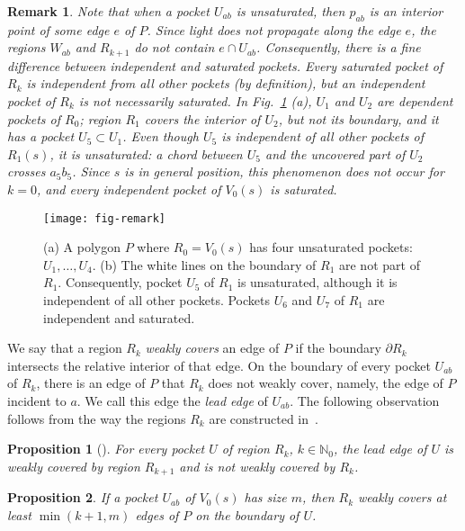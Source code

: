 \documentclass[12pt]{article}
\newtheorem{proposition}{Proposition}
\newtheorem{remark}{Remark}
\begin{document}
\begin{remark}\label{remark:1}{\rm
Note that when a pocket $U_{ab}$ is unsaturated, then $p_{ab}$ is an interior point of
some edge $e$ of $P$. Since light does not propagate along the edge $e$, the regions $W_{ab}$ and $R_{k+1}$ do not contain $e\cap U_{ab}$. Consequently, there is a fine difference between \emph{independent} and \emph{saturated} pockets. Every saturated pocket of $R_k$ is independent from all other pockets (by definition), but an independent pocket of $R_k$ is not necessarily saturated. In Fig.~\ref{fig:remark} (a), $U_1$ and $U_2$ are dependent
pockets of $R_0$; region $R_1$ covers the interior of $U_2$, but not its boundary, and it
has a pocket $U_5\subset U_1$. Even though $U_5$ is independent of all other pockets of $R_1(s)$,
it is unsaturated: a chord between $U_5$ and the uncovered part of $U_2$ crosses $a_5b_5$.
Since $s$ is in general position, this phenomenon does not occur for $k=0$, and
every independent pocket of $V_0(s)$ is saturated.}
\end{remark}

\begin{figure}[htp]
  \centering
  \texttt{[image: fig-remark]}
  \caption{\label{fig:remark}
(a) A polygon $P$ where $R_0=V_0(s)$ has four unsaturated pockets: $U_1,\ldots , U_4$.
(b) The white lines on the boundary of $R_1$ are not part of $R_1$.
Consequently, pocket $U_5$ of $R_1$ is unsaturated, although it is independent of all other pockets.
Pockets $U_6$ and $U_7$ of $R_1$ are independent and saturated.}
\end{figure}

We say that a region $R_k$ \emph{weakly covers} an edge of $P$ if the boundary $\partial R_k$
intersects the relative interior of that edge. On the boundary of every pocket $U_{ab}$ of $R_k$,
there is an edge of $P$ that $R_k$ does not weakly cover, namely, the edge of $P$ incident to $a$.
We call this edge the \emph{lead edge} of $U_{ab}$. The following observation follows from
the way the regions $R_k$ are constructed in~\cite{Us}.

\begin{proposition}[\cite{Us}]\label{pp:Us}
For every pocket $U$ of region $R_k$, $k\in \mathbb{N}_0$,
the lead edge of $U$ is weakly covered by region $R_{k+1}$
and \emph{is not} weakly covered by $R_k$.
\end{proposition}

\begin{proposition}\label{pp:Us+}
If a pocket $U_{ab}$ of $V_0(s)$ has size $m$, then $R_k$
weakly covers at least $\min(k+1,m)$ edges of $P$ on the boundary of $U$.
\end{proposition}
\end{document}
